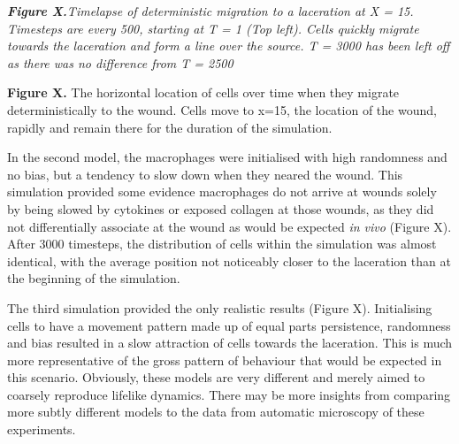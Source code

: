 \documentclass[12pt,a4paper]{report}
\begin{document}
{\bfseries {\itshape Figure X.}}{\itshape  Timelapse of deterministic 
migration to a laceration at X = 15. Timesteps are every 500, starting 
at T = 1 (Top left). Cells quickly migrate towards the laceration and 
form a line over the source. T = 3000 has been left off as there was no 
difference from T = 2500}



\begin{figure}[H]
\centering
\end{figure}


{\bfseries Figure X.} The horizontal location of cells over time when 
they migrate deterministically to the wound. Cells move to x=15, the 
location of the wound, rapidly and remain there for the duration of the 
simulation.



In the second model, the macrophages were initialised with high 
randomness and no bias, but a tendency to slow down when they neared the 
wound. This simulation provided some evidence macrophages do not arrive 
at wounds solely by being slowed by cytokines or exposed collagen at 
those wounds, as they did not differentially associate at the wound as 
would be expected {\itshape in vivo} (Figure X). After 3000 timesteps, 
the distribution of cells within the simulation was almost identical, 
with the average position not noticeably closer to the laceration than 
at the beginning of the simulation.\begin{figure}[H]
\centering
\end{figure}


The third simulation provided the only realistic results (Figure X). 
Initialising cells to have a movement pattern made up of equal parts 
persistence, randomness and bias resulted in a slow attraction of cells 
towards the laceration. This is much more representative of the gross 
pattern of behaviour that would be expected in this scenario. Obviously, 
these models are very different and merely aimed to coarsely reproduce 
lifelike dynamics. There may be more insights from comparing more subtly 
different models to the data from automatic microscopy of these 
experiments.

\begin{figure}[H]
\centering
\end{figure}
\end{document}
